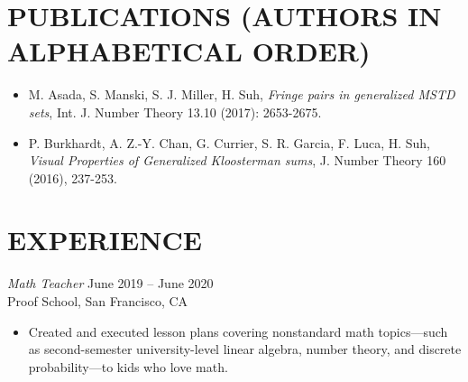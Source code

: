 \documentclass{simplecv}
\begin{document}
\section{PUBLICATIONS (AUTHORS IN ALPHABETICAL ORDER)}
\begin{itemize}
  \item M. Asada, S. Manski, S. J. Miller, H. Suh, \emph{Fringe pairs in generalized MSTD sets}, Int. J. Number Theory 13.10 (2017): 2653-2675. %
  \item P. Burkhardt, A. Z.-Y. Chan, G. Currier, S. R. Garcia, F. Luca, H. Suh, \emph{Visual Properties of Generalized Kloosterman sums}, J. Number Theory 160 (2016), 237-253. %
\end{itemize}

\section{EXPERIENCE}
{\sl Math Teacher} \hfill June 2019 -- June 2020 \\
Proof School, San Francisco, CA
\begin{itemize}
  \item Created and executed lesson plans covering nonstandard math topics---such as second-semester university-level linear algebra, number theory, and discrete probability---to kids who love math.
\end{itemize}
\end{document}
